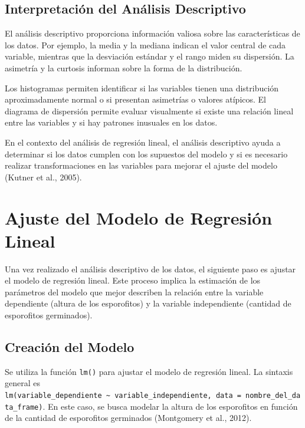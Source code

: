 \documentclass[
  spanish,
  a4paper,
  DIV=11,
  numbers=noendperiod,
  onepage,
  openany]{scrreprt}
\begin{document}
\subsection{Interpretación del Análisis
Descriptivo}\label{interpretaciuxf3n-del-anuxe1lisis-descriptivo}

El análisis descriptivo proporciona información valiosa sobre las
características de los datos. Por ejemplo, la media y la mediana indican
el valor central de cada variable, mientras que la desviación estándar y
el rango miden su dispersión. La asimetría y la curtosis informan sobre
la forma de la distribución.

Los histogramas permiten identificar si las variables tienen una
distribución aproximadamente normal o si presentan asimetrías o valores
atípicos. El diagrama de dispersión permite evaluar visualmente si
existe una relación lineal entre las variables y si hay patrones
inusuales en los datos.

En el contexto del análisis de regresión lineal, el análisis descriptivo
ayuda a determinar si los datos cumplen con los supuestos del modelo y
si es necesario realizar transformaciones en las variables para mejorar
el ajuste del modelo (Kutner et al., 2005).

\section{Ajuste del Modelo de Regresión
Lineal}\label{ajuste-del-modelo-de-regresiuxf3n-lineal}

Una vez realizado el análisis descriptivo de los datos, el siguiente
paso es ajustar el modelo de regresión lineal. Este proceso implica la
estimación de los parámetros del modelo que mejor describen la relación
entre la variable dependiente (altura de los esporofitos) y la variable
independiente (cantidad de esporofitos germinados).

\subsection{Creación del Modelo}\label{creaciuxf3n-del-modelo}

Se utiliza la función \texttt{lm()} para ajustar el modelo de regresión
lineal. La sintaxis general es
\texttt{lm(variable\_dependiente\ \textasciitilde{}\ variable\_independiente,\ data\ =\ nombre\_del\_data\_frame)}.
En este caso, se busca modelar la altura de los esporofitos en función
de la cantidad de esporofitos germinados (Montgomery et al., 2012).
\end{document}
